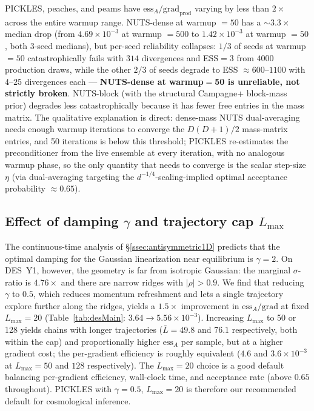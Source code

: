 \documentclass{article}
\begin{document}
PICKLES, peaches, and peams have $\mathrm{ess}_A/\text{grad}_{\text{prod}}$
varying by less than $2\times$ across the entire warmup range. NUTS-dense
at warmup $=50$ has a $\sim\!3.3\times$ median drop (from $4.69\times 10^{-3}$
at warmup $=500$ to $1.42\times 10^{-3}$ at warmup $=50$, both $3$-seed
medians), but per-seed reliability collapses: $1/3$ of seeds at
warmup $=50$ catastrophically fails with $314$ divergences and ESS$=3$
from $4000$ production draws, while the other $2/3$ of seeds degrade
to ESS $\approx 600$--$1100$ with $4$--$25$ divergences each ---
\textbf{NUTS-dense at warmup$=$50 is unreliable, not strictly broken}.
NUTS-block (with the structural Campagne+ block-mass prior) degrades
less catastrophically because it has fewer free entries in the mass
matrix.  The qualitative
explanation is direct: dense-mass NUTS dual-averaging needs enough warmup
iterations to converge the $D(D+1)/2$ mass-matrix entries, and 50
iterations is below this threshold; PICKLES re-estimates the
preconditioner from the live ensemble at every iteration, with no
analogous warmup phase, so the only quantity that needs to converge is
the scalar step-size $\eta$ (via dual-averaging targeting the
$d^{-1/4}$-scaling-implied optimal acceptance probability $\approx 0.65$).

\subsection{Effect of damping $\gamma$ and trajectory cap $L_{\max}$}
\label{ssec:desGamma}

The continuous-time analysis of \S\ref{ssec:antisymmetric1D} predicts that
the optimal damping for the Gaussian linearization near equilibrium is
$\gamma=2$. On DES~Y1, however, the geometry is far from isotropic
Gaussian: the marginal $\sigma$-ratio is $4.76\times$ and there are
narrow ridges with $|\rho|>0.9$. We find that reducing $\gamma$ to
$0.5$, which reduces momentum refreshment and lets a single trajectory
explore further along the ridges, yields a $1.5\times$ improvement in
$\mathrm{ess}_A/\text{grad}$ at fixed $L_{\max}=20$
(Table~\ref{tab:desMain}: $3.64\to 5.56\times 10^{-3}$). Increasing
$L_{\max}$ to 50 or 128 yields chains with longer trajectories
($\bar L=49.8$ and $76.1$ respectively, both within the cap) and
proportionally higher $\mathrm{ess}_A$ per sample, but at a higher
gradient cost; the per-gradient efficiency is roughly equivalent
($4.6$ and $3.6\times 10^{-3}$ at $L_{\max}=50$ and $128$ respectively).
The $L_{\max}=20$ choice is a good default balancing per-gradient
efficiency, wall-clock time, and acceptance rate (above $0.65$
throughout). PICKLES with $\gamma=0.5$, $L_{\max}=20$ is therefore our
recommended default for cosmological inference.
\end{document}

